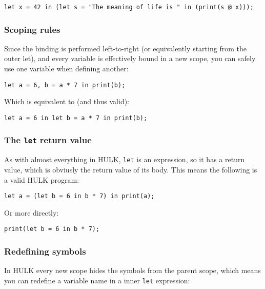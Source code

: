 \documentclass[a4paper, 12pt]{report}
\begin{document}
\begin{lstlisting}
let x = 42 in (let s = "The meaning of life is " in (print(s @ x)));
\end{lstlisting}

\subsubsection*{Scoping rules}

Since the binding is performed left-to-right (or equivalently starting from the outer let), and every
variable is effectively bound in a new scope, you can safely use one variable when defining another:

\begin{lstlisting}
let a = 6, b = a * 7 in print(b);
\end{lstlisting}

Which is equivalent to (and thus valid):

\begin{lstlisting}
let a = 6 in let b = a * 7 in print(b);
\end{lstlisting}

\subsubsection*{The {\tt let} return value}

As with almost everything in HULK, {\tt let} is an expression, so it has a return value, which is obviusly the return
value of its body. This means the following is a valid HULK program:

\begin{lstlisting}
let a = (let b = 6 in b * 7) in print(a);
\end{lstlisting}

Or more directly:

\begin{lstlisting}
print(let b = 6 in b * 7);
\end{lstlisting}

\subsubsection*{Redefining symbols}

In HULK every new scope hides the symbols from the parent scope, which means you can redefine a variable name
in a inner {\tt let} expression:
\end{document}
